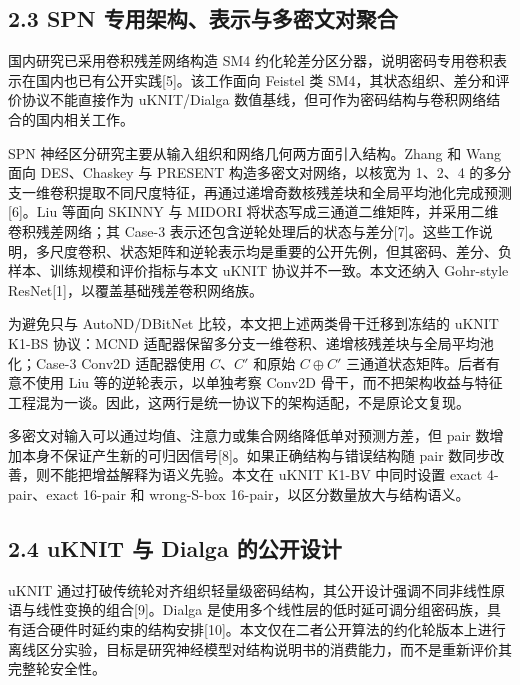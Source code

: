 \documentclass{templates/cjc-utf8}
\begin{document}
\hypertarget{spn-ux4e13ux7528ux67b6ux6784ux8868ux793aux4e0eux591aux5bc6ux6587ux5bf9ux805aux5408}{%
\subsection{2.3 SPN
专用架构、表示与多密文对聚合}\label{spn-ux4e13ux7528ux67b6ux6784ux8868ux793aux4e0eux591aux5bc6ux6587ux5bf9ux805aux5408}}

国内研究已采用卷积残差网络构造 SM4
约化轮差分区分器，说明密码专用卷积表示在国内也已有公开实践{[}5{]}。该工作面向
Feistel 类 SM4，其状态组织、差分和评价协议不能直接作为 uKNIT/Dialga
数值基线，但可作为密码结构与卷积网络结合的国内相关工作。

SPN 神经区分研究主要从输入组织和网络几何两方面引入结构。Zhang 和 Wang
面向 DES、Chaskey 与 PRESENT 构造多密文对网络，以核宽为 1、2、4
的多分支一维卷积提取不同尺度特征，再通过递增奇数核残差块和全局平均池化完成预测{[}6{]}。Liu
等面向 SKINNY 与 MIDORI
将状态写成三通道二维矩阵，并采用二维卷积残差网络；其 Case-3
表示还包含逆轮处理后的状态与差分{[}7{]}。这些工作说明，多尺度卷积、状态矩阵和逆轮表示均是重要的公开先例，但其密码、差分、负样本、训练规模和评价指标与本文
uKNIT 协议并不一致。本文还纳入 Gohr-style
ResNet{[}1{]}，以覆盖基础残差卷积网络族。

为避免只与 AutoND/DBitNet 比较，本文把上述两类骨干迁移到冻结的 uKNIT
K1-BS 协议：MCND
适配器保留多分支一维卷积、递增核残差块与全局平均池化；Case-3 Conv2D
适配器使用 \(C\)、\(C'\) 和原始 \(C\oplus C'\)
三通道状态矩阵。后者有意不使用 Liu 等的逆轮表示，以单独考察 Conv2D
骨干，而不把架构收益与特征工程混为一谈。因此，这两行是统一协议下的架构适配，不是原论文复现。

多密文对输入可以通过均值、注意力或集合网络降低单对预测方差，但 pair
数增加本身不保证产生新的可归因信号{[}8{]}。如果正确结构与错误结构随 pair
数同步改善，则不能把增益解释为语义先验。本文在 uKNIT K1-BV 中同时设置
exact 4-pair、exact 16-pair 和 wrong-S-box
16-pair，以区分数量放大与结构语义。

\hypertarget{uknit-ux4e0e-dialga-ux7684ux516cux5f00ux8bbeux8ba1}{%
\subsection{2.4 uKNIT 与 Dialga
的公开设计}\label{uknit-ux4e0e-dialga-ux7684ux516cux5f00ux8bbeux8ba1}}

uKNIT
通过打破传统轮对齐组织轻量级密码结构，其公开设计强调不同非线性原语与线性变换的组合{[}9{]}。Dialga
是使用多个线性层的低时延可调分组密码族，具有适合硬件时延约束的结构安排{[}10{]}。本文仅在二者公开算法的约化轮版本上进行离线区分实验，目标是研究神经模型对结构说明书的消费能力，而不是重新评价其完整轮安全性。
\end{document}
